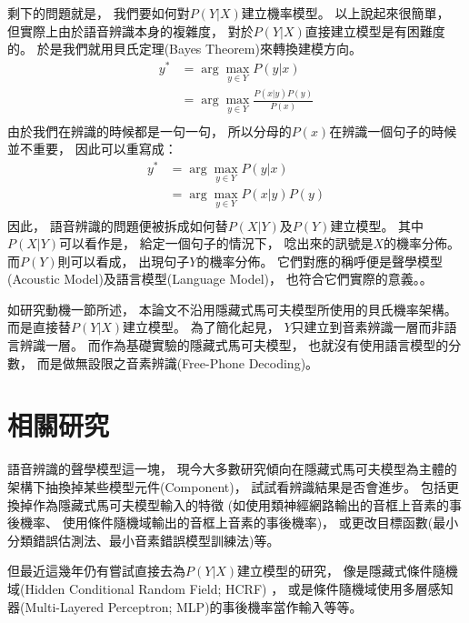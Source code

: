 剩下的問題就是，
我們要如何對$P(Y | X)$建立機率模型。
以上說起來很簡單，
但實際上由於語音辨識本身的複雜度，
對於$P(Y | X)$直接建立模型是有困難度的。
於是我們就用貝氏定理(Bayes Theorem)來轉換建模方向。
\begin{equation}
  \begin{split}
    y^{*} 
    &= \arg \max_{y \in Y} P(y | x) \\
    &= \arg \max_{y \in Y} \frac{ P(x | y) P(y) }{ P(x) } \\
  \end{split}
\end{equation}
由於我們在辨識的時候都是一句一句，
所以分母的$P(x)$在辨識一個句子的時候並不重要，
因此可以重寫成：
\begin{equation}
  \begin{split}
    y^{*} 
    &= \arg \max_{y \in Y} P(y | x) \\
    &= \arg \max_{y \in Y} P(x | y) P(y) \\
  \end{split}
\end{equation}
因此，
語音辨識的問題便被拆成如何替$P(X | Y)$及$P(Y)$建立模型。
其中$P(X | Y)$可以看作是，
給定一個句子的情況下，
唸出來的訊號是$X$的機率分佈。
而$P(Y)$則可以看成，
出現句子$Y$的機率分佈。
它們對應的稱呼便是聲學模型(Acoustic Model)及語言模型(Language Model)，
也符合它們實際的意義。。

如研究動機一節所述，
本論文不沿用隱藏式馬可夫模型所使用的貝氏機率架構。
而是直接替$P(Y|X)$建立模型。
為了簡化起見，
$Y$只建立到音素辨識一層而非語言辨識一層。
而作為基礎實驗的隱藏式馬可夫模型，
也就沒有使用語言模型的分數，
而是做無設限之音素辨識(Free-Phone Decoding)。

\section{相關研究}
  語音辨識的聲學模型這一塊，
  現今大多數研究傾向在隱藏式馬可夫模型為主體的架構下抽換掉某些模型元件(Component)，
  試試看辨識結果是否會進步。
  包括更換掉作為隱藏式馬可夫模型輸入的特徵
  (如使用類神經網路輸出的音框上音素的事後機率\cite{HermanskyTandem}、
  使用條件隨機域輸出的音框上音素的事後機率\cite{FoslerCrandem})，
  或更改目標函數(最小分類錯誤估測法\cite{Juang}、最小音素錯誤模型訓練法\cite{Povey})等。

  但最近這幾年仍有嘗試直接去為$P(Y|X)$建立模型的研究，
  像是隱藏式條件隨機域(Hidden Conditional Random Field; HCRF) \cite{AlexHCRF, SungHCRF}，
  或是條件隨機域使用多層感知器(Multi-Layered Perceptron; MLP)的事後機率當作輸入\cite{MorrisCRF}等等。
  
